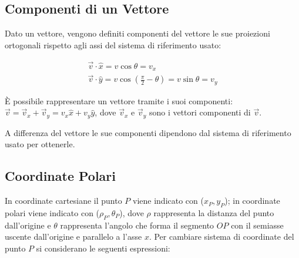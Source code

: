 \documentclass{article}
\numberwithin{equation}{subsection}
\begin{document}
\subsection{Componenti di un Vettore}
Dato un vettore, vengono definiti componenti del vettore le sue proiezioni ortogonali rispetto agli assi del sistema di riferimento usato:

\begin{gather}
    \vec{v}\cdot\hat{x} = v\cos\theta = v_x\\
    \vec{v}\cdot\hat{y} = v\cos\left(\displaystyle\frac{\pi}{2} - \theta\right) = v\sin\theta = v_y
\end{gather}

\`{E} possibile rappresentare un vettore tramite i suoi componenti: $\vec{v} = \vec{v}_x + \vec{v}_y = v_x\hat{x} + v_y\hat{y}$, dove $\vec{v}_x$ e $\vec{v}_y$ sono i vettori componenti di $\vec{v}$.

\begin{center}\end{center}

A differenza del vettore le sue componenti dipendono dal sistema di riferimento usato per ottenerle.

\subsection{Coordinate Polari}
In coordinate cartesiane il punto $P$ viene indicato con ($x_P, y_P$); in coordinate polari viene indicato con ($\rho_P, \theta_P$), dove 
$\rho$ rappresenta la distanza del punto dall'origine e $\theta$ rappresenta l'angolo che forma il segmento $OP$ con il semiasse uscente dall'origine e parallelo a l'asse $x$.
Per cambiare sistema di coordinate del punto $P$ si considerano le seguenti espressioni:  
\end{document}
